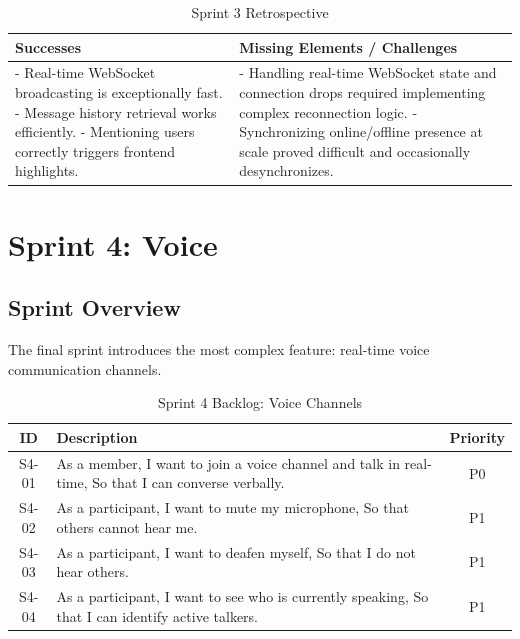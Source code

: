 \begin{table}[h!]
    \centering
    \begin{tabular}{|p{7cm}|p{7cm}|}
        \hline
        \textbf{Successes} & \textbf{Missing Elements / Challenges} \\
        \hline
        - Real-time WebSocket broadcasting is exceptionally fast. \newline - Message history retrieval works efficiently. \newline - Mentioning users correctly triggers frontend highlights. & - Handling real-time WebSocket state and connection drops required implementing complex reconnection logic. \newline - Synchronizing online/offline presence at scale proved difficult and occasionally desynchronizes. \\
        \hline
    \end{tabular}
    \caption{Sprint 3 Retrospective}
    \label{tab:sprint3_retro}
\end{table}


\section{Sprint 4: Voice}

\subsection{Sprint Overview}
The final sprint introduces the most complex feature: real-time voice communication channels.

\begin{table}[h!]
    \centering
    \begin{tabular}{|c|p{10cm}|c|}
        \hline
        \textbf{ID} & \textbf{Description} & \textbf{Priority} \\
        \hline
        S4-01 & As a member, I want to join a voice channel and talk in real-time, So that I can converse verbally. & P0 \\
        \hline
        S4-02 & As a participant, I want to mute my microphone, So that others cannot hear me. & P1 \\
        \hline
        S4-03 & As a participant, I want to deafen myself, So that I do not hear others. & P1 \\
        \hline
        S4-04 & As a participant, I want to see who is currently speaking, So that I can identify active talkers. & P1 \\
        \hline
    \end{tabular}
    \caption{Sprint 4 Backlog: Voice Channels}
    \label{tab:sprint4_backlog}
\end{table}


